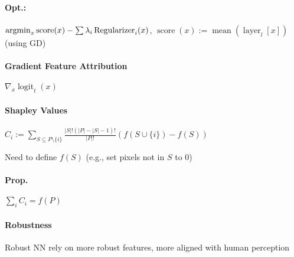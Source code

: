 \paragraph{Opt.:}
$\operatorname*{argmin}_x \operatorname{score}(x) - \sum \lambda_i \operatorname{Regularizer}_i(x)$, $\operatorname{score}(x) := \operatorname{mean}(\operatorname{layer}_l[x])$ (using GD)

\paragraph{Gradient Feature Attribution}
$\nabla_x \operatorname{logit}_t(x)$

\paragraph{Shapley Values}
$\displaystyle C_i := \sum_{S \subseteq P \setminus \{i\}} \frac{\lvert S \rvert! (\lvert P\rvert - \lvert S \rvert - 1) !}{\lvert P \rvert !} \left(f(S \cup \{i\}) - f(S) \right)$

Need to define $f(S)$ (e.g., set pixels not in $S$ to 0)

\paragraph{Prop.} $\sum_i C_i = f(P)$

\paragraph{Robustness} Robust NN rely on more robust features, more aligned with human perception